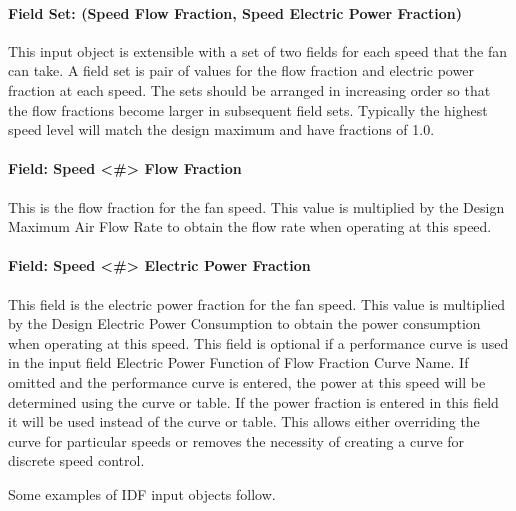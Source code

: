 \paragraph{Field Set: (Speed Flow Fraction, Speed Electric Power Fraction)}\label{fieldset-flow-power-fractions-fansysmodel}

This input object is extensible with a set of two fields for each speed that the fan can take.  A field set is pair of values for the flow fraction and electric power fraction at each speed. The sets should be arranged in increasing order so that the flow fractions become larger in subsequent field sets.  Typically the highest speed level will match the design maximum and have fractions of 1.0.

\paragraph{Field: Speed <#> Flow Fraction}\label{field-speed-flow-fraction-fansysmodel}
This is the flow fraction for the fan speed.  This value is multiplied by the Design Maximum Air Flow Rate to obtain the flow rate when operating at this speed.

\paragraph{Field: Speed <#> Electric Power Fraction}\label{field-speed-power-fraction-fansysmodel}

This field is the electric power fraction for the fan speed.  This value is multiplied by the Design Electric Power Consumption to obtain the power consumption when operating at this speed.  This field is optional if a performance curve is used in the input field Electric Power Function of Flow Fraction Curve Name.  If omitted and the performance curve is entered, the power at this speed will be determined using the curve or table.  If the power fraction is entered in this field it will be used instead of the curve or table.  This allows either overriding the curve for particular speeds or removes the necessity of creating a curve for discrete speed control.

Some examples of IDF input objects follow.


